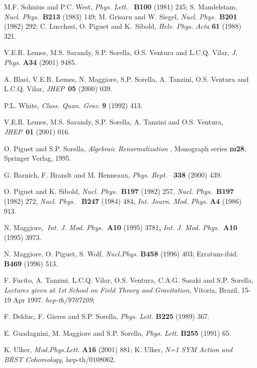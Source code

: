 \documentclass[a4paper,12pt]{article}
\begin{document}
\begin{thebibliography}{99}
  M.F. Sohnius and P.C. West, \emph{Phys. Lett.}\textit{\ }%
\textbf{B100 }(1981) 245;\newline
S. Mandelstam, \emph{Nucl. Phys.}\textit{\ }\textbf{B213} (1983) 149;\newline
M. Grisaru and W. Siegel, \emph{Nucl. Phys.}\textit{\ }\textbf{B201} (1982)
292;\newline
C. Lucchesi, O. Piguet and K.\ Sibold, \emph{Helv. Phys. Acta }\textbf{61 }%
(1988) 321.

  V.E.R. Lemes, M.S. Sarandy, S.P. Sorella, O.S. Ventura and
L.C.Q. Vilar, \emph{J. Phys. }\textbf{A34} (2001) 9485.

  A. Blasi, V.E.R. Lemes, N. Maggiore, S.P. Sorella, A. Tanzini,
O.S. Ventura and L.C.Q. Vilar, \emph{JHEP}\textit{\ }\textbf{05} (2000) 039.

  P.L. White, \emph{Class. Quan. Grav. }\textbf{9 }(1992) 413.

  V.E.R. Lemes, M.S. Sarandy, S.P. Sorella, A. Tanzini and O.S.
Ventura, \emph{JHEP}\textit{\ }\textbf{01} (2001) 016.

  O. Piguet and S.P. Sorella, \emph{Algebraic Renormalization}%
, Monograph series \textbf{m28}, Springer Verlag, 1995.\emph{\ }

  G. Barnich, F. Brandt and M. Henneaux, \emph{Phys. Rept.}%
\textbf{\ 338 }(2000) 439.

  O. Piguet and K. Sibold, \emph{Nucl. Phys.}\textbf{\ B197 }%
(1982) 257, \emph{Nucl. Phys.}\textbf{\ B197 }(1982) 272, \emph{Nucl. Phys.}%
\textbf{\ B247 }(1984) 484, \emph{Int. Journ. Mod. Phys. }\textbf{A4 }(1986)
913.

  N. Maggiore,\textbf{\ }\emph{Int. J. Mod. Phys.}\textbf{\ A10 }%
(1995) 3781\textbf{, }\emph{Int. J. Mod. Phys.}\textbf{\ A10 }(1995) 3973.

  N. Maggiore, O. Piguet, S. Wolf, \emph{Nucl.Phys. }\textbf{%
B458 }(1996) 403; Erratum-ibid. \textbf{B469} (1996) 513.

  F. Fucito, A. Tanzini, L.C.Q. Vilar, O.S. Ventura, C.A.G.
Sasaki and S.P. Sorella, \emph{Lectures given at 1st School on} \emph{Field
Theory and Gravitation}, Vitoria, Brazil, 15-19 Apr 1997. \emph{%
hep-th/9707209};

  F. Delduc, F. Gieres and S.P. Sorella, \emph{Phys. Lett. }%
\textbf{B225 }(1989) 367.

  E. Guadagnini, M. Maggiore and S.P. Sorella, \emph{Phys.
Lett. }\textbf{B255 }(1991) 65.

  K. Ulker, \emph{Mod.Phys.Lett.} \textbf{A16} (2001) 881;%
\newline
K. Ulker, \textit{N=1 SYM Action and BRST Cohomology, }hep-th/0108062.
\end{thebibliography}
\end{document}
